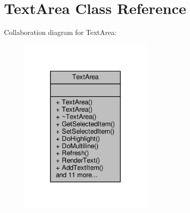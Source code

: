\hypertarget{classTextArea}{}\section{Text\+Area Class Reference}
\label{classTextArea}


Collaboration diagram for Text\+Area\+:
\nopagebreak
\begin{figure}[H]
\begin{center}
\leavevmode
\includegraphics[width=185pt]{d3/d2d/classTextArea__coll__graph}
\end{center}
\end{figure}
